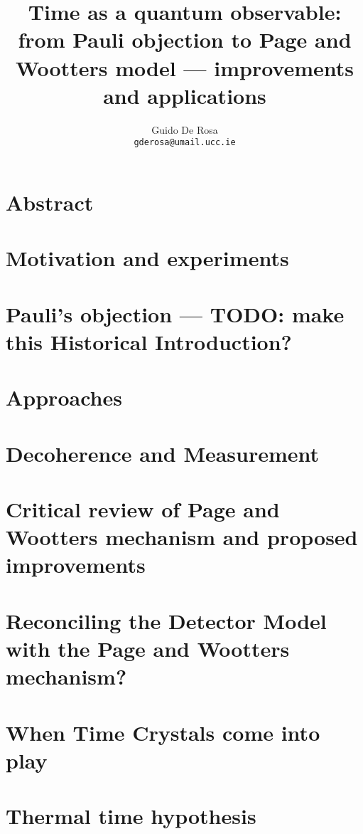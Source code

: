 \documentclass[oneside]{book}
\author{Guido De Rosa \\ \small\tt{gderosa@umail.ucc.ie}}
\title{Time as a quantum observable: from Pauli objection to Page and Wootters model --- improvements and applications}
\begin{document}
\maketitle

\tableofcontents

\chapter*{Abstract}


\chapter{Motivation and experiments}


\chapter{Pauli's objection --- TODO: make this Historical Introduction?}



\chapter{Approaches}


\chapter{Decoherence and Measurement}


\chapter{Critical review of Page and Wootters mechanism and proposed improvements}



\chapter{Reconciling the Detector Model with the Page and Wootters mechanism?}


\chapter{When Time Crystals come into play}


\chapter{Thermal time hypothesis}

\end{document}
